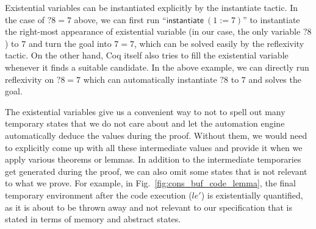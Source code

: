 Existential variables can be instantiated explicitly by the \textsf{instantiate}
tactic. In the case of $?8=7$ above, we can first run
``$\textsf{instantiate}~(1:=7)$'' to instantiate the right-most appearance of
existential variable (in our case, the only variable $?8$) to $7$ and turn
the goal into $7=7$, which can be solved easily by the \textsf{reflexivity} tactic.
On the other hand, Coq itself also tries to fill the existential variable
whenever it finds a suitable candidate. In the above example, we can directly
run \textsf{reflexivity} on $?8=7$ which can automatically instantiate
$?8$ to $7$ and solves the goal.

The existential variables give us a convenient way to not to spell out many
temporary states that we do not care about and let the automation engine
automatically deduce the values during the proof. Without them, we would need
to explicitly come up with all these intermediate values and provide it when
we apply various theorems or lemmas. In addition to the intermediate temporaries
get generated during the proof, we can also omit some states that is not
relevant to what we prove. For example, in Fig.~\ref{fig:cons_buf_code_lemma},
the final temporary environment after the code execution ($le'$) is existentially
quantified, as it is about to be thrown away and not relevant to our specification
that is stated in terms of memory and abstract states.

